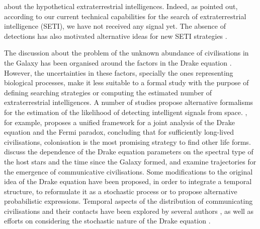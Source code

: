 \documentclass[crop]{CSLB}
\begin{document}
about the hypothetical extraterrestrial intelligences.
%
Indeed, as \citet{tarter_search_2001} pointed out, according to our
current technical capabilities for the search of extraterrestrial
intelligence (SETI), we have not received any signal yet.
%
The absence of detections has also motivated alternative ideas for new
SETI strategies \citep{forgan_exoplanet_2017, balbi_impact_2018,
loeb_eavesdropping_2006, maccone_KLT_2010, tarter_advancing_2009,
enriquez_breakthrough_2017, loeb_relative_2016, maccone_SETI_2011,
lingam_relative_2019, wright_theGsearch_2015, maccone_SETI_2013,
maccone_lognormals_2014, harp_application_2018,
forgan_possibility_2013, forgan_galactic_2017, funes_searching_2019}.



\Fpagebreak


The discussion about the problem of the unknown abundance of
civilisations in the Galaxy has been organised around the factors in
the Drake equation \citep{hinkel_interdisciplinary_2019}.
%
However, the uncertainties in these factors, specially the ones
representing biological processes, make it less suitable to a formal
study with the purpose of defining searching strategies or computing
the estimated number of extraterrestrial intelligences.
%
A number of studies propose alternative formalisms for the estimation
of the likelihood of detecting intelligent signals from space.
%
\citet{prantzos_joint_2013}, for example, proposes a unified framework
for a joint analysis of the Drake equation and the Fermi paradox,
concluding that for sufficiently long-lived civilisations,
colonisation is the most promising strategy to find other life forms.
%
\citet{haqq-misra_drake_2017} discuss the dependence of the Drake
equation parameters on the spectral type of the host stars and the
time since the Galaxy formed, and examine trajectories for the
emergence of communicative civilisations.
%
Some modifications to the original idea of the Drake equation have
been proposed, in order to integrate a temporal structure, to
reformulate it as a stochastic process or to propose alternative
probabilistic expressions.
%
Temporal aspects of the distribution of communicating civilisations
and their contacts have been explored by several authors
\citep{fogg_temporal_1987, forgan_spatiotemporal_2011,
balbi_impact_2018, balb_spatiotemporal_2018, horvat_impact_2011}, as
well as efforts on considering the stochastic nature of the Drake
equation \citep{glade_stochastic_2011}.
\end{document}
